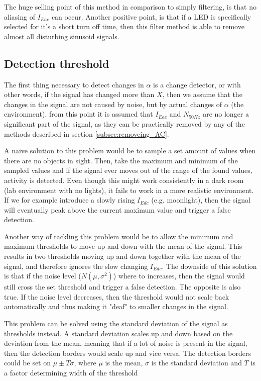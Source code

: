 The huge selling point of this method in comparison to simply filtering, is that no aliasing of $I_{Eac}$ can occur. Another positive point, is that if a LED is specifically selected for it's a short turn off time, then this filter method is able to remove almost all disturbing sinusoid signals. 

\subsection{Detection threshold}
The first thing necessary to detect changes in $\alpha$ is a change detector, or with other words, if the signal has changed more than $X$, then we assume that the changes in the signal are not caused by noise, but by actual changes of $\alpha$ (the environment). from this point it is assumed that $I_{Eac}$ and $N_{50Hz}$ are no longer a significant part of the signal, as they can be practically removed by any of the methods described in section \ref{subsec:removeing_AC}.

A naive solution to this problem would be to sample a set amount of values when there are no objects in sight. Then, take the maximum and minimum of the sampled values and if the signal ever moves out of the range of the found values, activity is detected. Even though this might work consistently in a dark room (lab environment with no lights), it fails to work in a more realistic environment. If we for example introduce a slowly rising $I_{Edc}$ (e.g. moonlight), then the signal will eventually peak above the current maximum value and trigger a false detection.

Another way of tackling this problem would be to allow the minimum and maximum thresholds to move up and down with the mean of the signal. This results in two thresholds moving up and down together with the mean of the signal, and therefore ignores the slow changing $I_{Edc}$. The downside of this solution is that if the noise level ($N(\mu,\sigma^2)$) where to increases, then the signal would still cross the set threshold and trigger a false detection. The opposite is also true. If the noise level decreases, then the threshold would not scale back automatically and thus making it "deaf" to smaller changes in the signal.

This problem can be solved using the standard deviation of the signal as thresholds instead. A standard deviation scales up and down based on the deviation from the mean, meaning that if a lot of noise is present in the signal, then the detection borders would scale up and vice versa. The detection borders could be set on $\mu\pm T\sigma$, where $\mu$ is the mean, $\sigma$ is the standard deviation and $T$ is a factor determining width of the threshold


